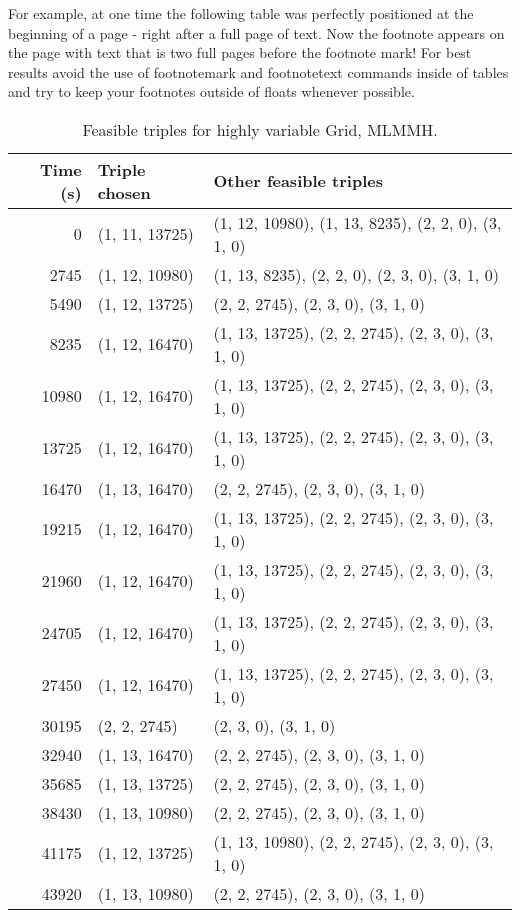 For example, at one time the following table was perfectly positioned at the beginning of a page - right after a full page of text. Now the footnote appears on the page with text that is two full pages before the footnote mark! For best results avoid the use of footnotemark and footnotetext commands inside of tables and try to keep your footnotes outside of floats whenever possible.



\begin{table}
\caption{Feasible triples for highly variable Grid, MLMMH.} \label{tbl1}
\begin{tabular}{r l l}
\hline {{Time (s)}} & {{Triple chosen}} & {{Other feasible triples}} \\ \hline
0 & (1, 11, 13725) & (1, 12, 10980), (1, 13, 8235), (2, 2, 0), (3, 1, 0) \\
2745 & (1, 12, 10980) & (1, 13, 8235), (2, 2, 0), (2, 3, 0), (3, 1, 0) \\
5490 & (1, 12, 13725) & (2, 2, 2745), (2, 3, 0), (3, 1, 0) \\
8235 & (1, 12, 16470) & (1, 13, 13725), (2, 2, 2745), (2, 3, 0), (3, 1, 0) \\
10980 & (1, 12, 16470) & (1, 13, 13725), (2, 2, 2745), (2, 3, 0), (3, 1, 0) \\
13725 & (1, 12, 16470) & (1, 13, 13725), (2, 2, 2745), (2, 3, 0), (3, 1, 0) \\
16470 & (1, 13, 16470) & (2, 2, 2745), (2, 3, 0), (3, 1, 0) \\
19215 & (1, 12, 16470) & (1, 13, 13725), (2, 2, 2745), (2, 3, 0), (3, 1, 0) \\
21960 & (1, 12, 16470) & (1, 13, 13725), (2, 2, 2745), (2, 3, 0), (3, 1, 0) \\
24705 & (1, 12, 16470) & (1, 13, 13725), (2, 2, 2745), (2, 3, 0), (3, 1, 0) \\
27450 & (1, 12, 16470) & (1, 13, 13725), (2, 2, 2745), (2, 3, 0), (3, 1, 0) \\
30195 & (2, 2, 2745) & (2, 3, 0), (3, 1, 0) \\
32940 & (1, 13, 16470) & (2, 2, 2745), (2, 3, 0), (3, 1, 0) \\
35685 & (1, 13, 13725) & (2, 2, 2745), (2, 3, 0), (3, 1, 0) \\
38430 & (1, 13, 10980) & (2, 2, 2745), (2, 3, 0), (3, 1, 0) \\
41175 & (1, 12, 13725) & (1, 13, 10980), (2, 2, 2745), (2, 3, 0), (3, 1, 0) \\
43920 & (1, 13, 10980) & (2, 2, 2745), (2, 3, 0), (3, 1, 0) \\

\end{tabular}
\end{table}
